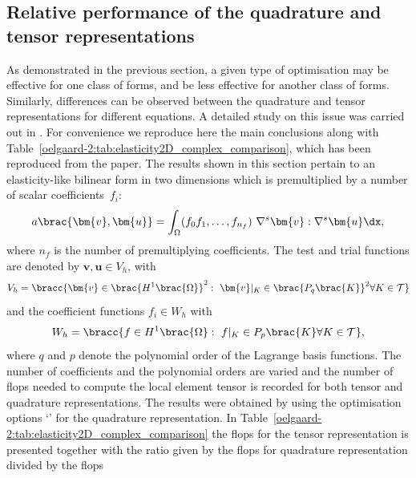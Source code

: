 \subsection{Relative performance of the quadrature and tensor representations}
\label{oelgaard-2:sec:performance_of_representations}
%
As demonstrated in the previous section, a given type of optimisation may
be effective for one class of forms, and be less effective
for another class of forms.
Similarly, differences can be observed between the quadrature and
tensor representations for different equations.
A detailed study on this issue was carried out in \citet{oelgaard:2010}.
For convenience we reproduce here the main conclusions along with
Table~\ref{oelgaard-2:tab:elasticity2D_complex_comparison}, which has been
reproduced from the paper.
The results shown in this section pertain to an elasticity-like bilinear form
in two dimensions which is premultiplied by a number of scalar
coefficients~$f_{i}$:
%
\begin{equation}
  a\brac{\bm{v}, \bm{u}} = \int_{\Omega} (f_0 f_1, \ldots, f_{n_f} )\
  \nabla^s \bm{v} : \nabla^s \bm{u} \dx,
\label{oelgaard-2:eq:elasticity_form}
\end{equation}
%
where $n_f$ is the number of premultiplying coefficients.
The test and trial functions are denoted by $\bm{v}, \bm{u} \in V_{h}$, with
%
\begin{equation}
  V_{h} = \bracc{\bm{v} \in \brac{H^{1}\brac{\Omega}}^2: \ \bm{v}\vert_K \in \brac{P_{q}\brac{K}}^2
   \forall K \in \mathcal{T}}
\label{oelgaard-2:eq:elastictity_H1_vector_space}
\end{equation}
%
and the coefficient functions $f_{i} \in W_{h}$ with
%
\begin{equation}
  W_{h} = \bracc{f \in H^{1}\brac{\Omega}: \ f\vert_K \in P_{p}\brac{K}
   \forall K \in \mathcal{T}},
\label{oelgaard-2:eq:elasticity_H1_space}
\end{equation}
%
where $q$ and $p$ denote the polynomial order of the Lagrange basis functions.
The number of coefficients and the polynomial orders are varied and the number
of flops needed to compute the local element tensor is recorded for both
tensor and quadrature representations.
The results were obtained by using the optimisation options
`' for the quadrature
representation.
In Table~\ref{oelgaard-2:tab:elasticity2D_complex_comparison}
the flops for the tensor representation is presented together with the
ratio given by the flops for quadrature representation divided by the flops
